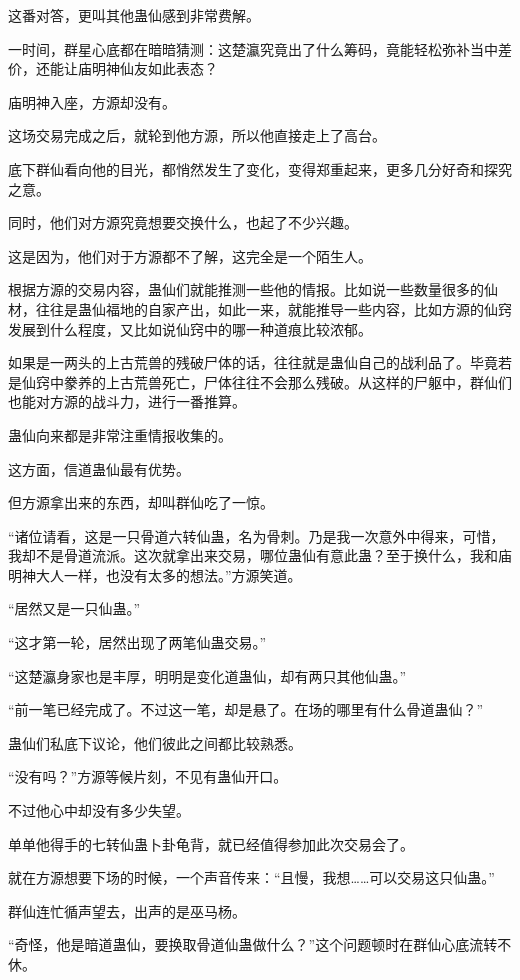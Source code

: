 \begin{this_body}
这番对答，更叫其他蛊仙感到非常费解。

一时间，群星心底都在暗暗猜测：这楚瀛究竟出了什么筹码，竟能轻松弥补当中差价，还能让庙明神仙友如此表态？

庙明神入座，方源却没有。

这场交易完成之后，就轮到他方源，所以他直接走上了高台。

底下群仙看向他的目光，都悄然发生了变化，变得郑重起来，更多几分好奇和探究之意。

同时，他们对方源究竟想要交换什么，也起了不少兴趣。

这是因为，他们对于方源都不了解，这完全是一个陌生人。

根据方源的交易内容，蛊仙们就能推测一些他的情报。比如说一些数量很多的仙材，往往是蛊仙福地的自家产出，如此一来，就能推导一些内容，比如方源的仙窍发展到什么程度，又比如说仙窍中的哪一种道痕比较浓郁。

如果是一两头的上古荒兽的残破尸体的话，往往就是蛊仙自己的战利品了。毕竟若是仙窍中豢养的上古荒兽死亡，尸体往往不会那么残破。从这样的尸躯中，群仙们也能对方源的战斗力，进行一番推算。

蛊仙向来都是非常注重情报收集的。

这方面，信道蛊仙最有优势。

但方源拿出来的东西，却叫群仙吃了一惊。

“诸位请看，这是一只骨道六转仙蛊，名为骨刺。乃是我一次意外中得来，可惜，我却不是骨道流派。这次就拿出来交易，哪位蛊仙有意此蛊？至于换什么，我和庙明神大人一样，也没有太多的想法。”方源笑道。

“居然又是一只仙蛊。”

“这才第一轮，居然出现了两笔仙蛊交易。”

“这楚瀛身家也是丰厚，明明是变化道蛊仙，却有两只其他仙蛊。”

“前一笔已经完成了。不过这一笔，却是悬了。在场的哪里有什么骨道蛊仙？”

蛊仙们私底下议论，他们彼此之间都比较熟悉。

“没有吗？”方源等候片刻，不见有蛊仙开口。

不过他心中却没有多少失望。

单单他得手的七转仙蛊卜卦龟背，就已经值得参加此次交易会了。

就在方源想要下场的时候，一个声音传来：“且慢，我想……可以交易这只仙蛊。”

群仙连忙循声望去，出声的是巫马杨。

“奇怪，他是暗道蛊仙，要换取骨道仙蛊做什么？”这个问题顿时在群仙心底流转不休。


\end{this_body}
